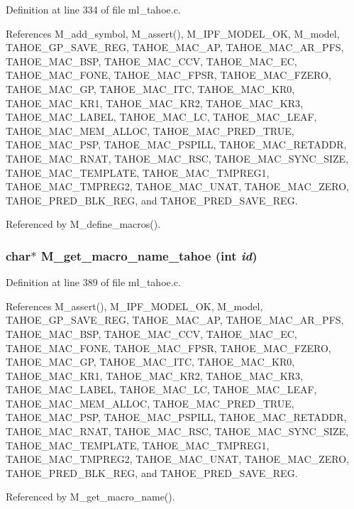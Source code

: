 Definition at line 334 of file ml\_\-tahoe.c.

References M\_\-add\_\-symbol, M\_\-assert(), M\_\-IPF\_\-MODEL\_\-OK, M\_\-model, TAHOE\_\-GP\_\-SAVE\_\-REG, TAHOE\_\-MAC\_\-AP, TAHOE\_\-MAC\_\-AR\_\-PFS, TAHOE\_\-MAC\_\-BSP, TAHOE\_\-MAC\_\-CCV, TAHOE\_\-MAC\_\-EC, TAHOE\_\-MAC\_\-FONE, TAHOE\_\-MAC\_\-FPSR, TAHOE\_\-MAC\_\-FZERO, TAHOE\_\-MAC\_\-GP, TAHOE\_\-MAC\_\-ITC, TAHOE\_\-MAC\_\-KR0, TAHOE\_\-MAC\_\-KR1, TAHOE\_\-MAC\_\-KR2, TAHOE\_\-MAC\_\-KR3, TAHOE\_\-MAC\_\-LABEL, TAHOE\_\-MAC\_\-LC, TAHOE\_\-MAC\_\-LEAF, TAHOE\_\-MAC\_\-MEM\_\-ALLOC, TAHOE\_\-MAC\_\-PRED\_\-TRUE, TAHOE\_\-MAC\_\-PSP, TAHOE\_\-MAC\_\-PSPILL, TAHOE\_\-MAC\_\-RETADDR, TAHOE\_\-MAC\_\-RNAT, TAHOE\_\-MAC\_\-RSC, TAHOE\_\-MAC\_\-SYNC\_\-SIZE, TAHOE\_\-MAC\_\-TEMPLATE, TAHOE\_\-MAC\_\-TMPREG1, TAHOE\_\-MAC\_\-TMPREG2, TAHOE\_\-MAC\_\-UNAT, TAHOE\_\-MAC\_\-ZERO, TAHOE\_\-PRED\_\-BLK\_\-REG, and TAHOE\_\-PRED\_\-SAVE\_\-REG.

Referenced by M\_\-define\_\-macros().
\subsubsection{\setlength{\rightskip}{0pt plus 5cm}char$\ast$ M\_\-get\_\-macro\_\-name\_\-tahoe (int {\em id})}\label{m__tahoe_8h_dd830cd2d2e6ec0c5631555281f98c1e}




Definition at line 389 of file ml\_\-tahoe.c.

References M\_\-assert(), M\_\-IPF\_\-MODEL\_\-OK, M\_\-model, TAHOE\_\-GP\_\-SAVE\_\-REG, TAHOE\_\-MAC\_\-AP, TAHOE\_\-MAC\_\-AR\_\-PFS, TAHOE\_\-MAC\_\-BSP, TAHOE\_\-MAC\_\-CCV, TAHOE\_\-MAC\_\-EC, TAHOE\_\-MAC\_\-FONE, TAHOE\_\-MAC\_\-FPSR, TAHOE\_\-MAC\_\-FZERO, TAHOE\_\-MAC\_\-GP, TAHOE\_\-MAC\_\-ITC, TAHOE\_\-MAC\_\-KR0, TAHOE\_\-MAC\_\-KR1, TAHOE\_\-MAC\_\-KR2, TAHOE\_\-MAC\_\-KR3, TAHOE\_\-MAC\_\-LABEL, TAHOE\_\-MAC\_\-LC, TAHOE\_\-MAC\_\-LEAF, TAHOE\_\-MAC\_\-MEM\_\-ALLOC, TAHOE\_\-MAC\_\-PRED\_\-TRUE, TAHOE\_\-MAC\_\-PSP, TAHOE\_\-MAC\_\-PSPILL, TAHOE\_\-MAC\_\-RETADDR, TAHOE\_\-MAC\_\-RNAT, TAHOE\_\-MAC\_\-RSC, TAHOE\_\-MAC\_\-SYNC\_\-SIZE, TAHOE\_\-MAC\_\-TEMPLATE, TAHOE\_\-MAC\_\-TMPREG1, TAHOE\_\-MAC\_\-TMPREG2, TAHOE\_\-MAC\_\-UNAT, TAHOE\_\-MAC\_\-ZERO, TAHOE\_\-PRED\_\-BLK\_\-REG, and TAHOE\_\-PRED\_\-SAVE\_\-REG.

Referenced by M\_\-get\_\-macro\_\-name().
